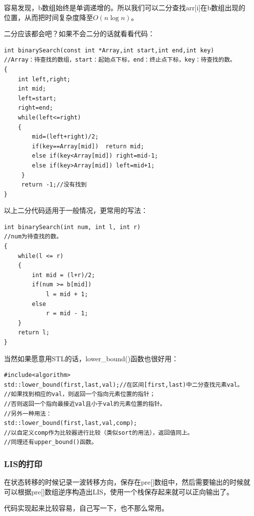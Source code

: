 \documentclass{article}
\theoremstyle{nonumberplain}
\begin{document}
容易发现，b数组始终是单调递增的。所以我们可以二分查找arr[i]在b数组出现的位置，从而把时间复杂度降至$O(n\log n)$。

二分应该都会吧？如果不会二分的话就看看代码：

\begin{verbatim}
int binarySearch(const int *Array,int start,int end,int key)
//Array：待查找的数组，start：起始点下标，end：终止点下标，key：待查找的数。
{
    int left,right;
    int mid;
    left=start;
    right=end;
    while(left<=right)
    {
        mid=(left+right)/2;
        if(key==Array[mid])  return mid;
        else if(key<Array[mid]) right=mid-1;
        else if(key>Array[mid]) left=mid+1;    
     }
     return -1;//没有找到
}
\end{verbatim}

以上二分代码适用于一般情况，更常用的写法：
\begin{verbatim}
int binarySearch(int num, int l, int r)
//num为待查找的数。
{    
    while(l <= r)    
    {    
        int mid = (l+r)/2;    
        if(num >= b[mid])    
            l = mid + 1;    
        else  
            r = mid - 1;    
    }    
    return l;
}
\end{verbatim}

当然如果愿意用STL的话，lower\_bound()函数也很好用：

\begin{verbatim}
#include<algorithm>
std::lower_bound(first,last,val);//在区间[first,last)中二分查找元素val。
//如果找到相应的val，则返回一个指向元素位置的指针；
//否则返回一个指向最接近val且小于val的元素位置的指针。
//另外一种用法：
std::lower_bound(first,last,val,comp);
//以自定义comp作为比较器进行比较（类似sort的用法），返回值同上。
//同理还有upper_bound()函数。
\end{verbatim}
\subsubsection{LIS的打印}
在状态转移的时候记录一波转移方向，保存在pre[]数组中，然后需要输出的时候就可以根据pre[]数组逆序构造出LIS，使用一个栈保存起来就可以正向输出了。

代码实现起来比较容易，自己写一下，也不那么常用。
\end{document}
